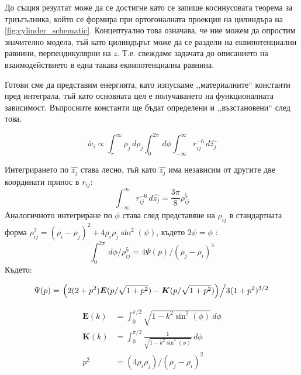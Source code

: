 До същия резултат може да се достигне като се запише косинусовата теорема за триъгълника, който се формира при ортогоналната проекция на цилиндъра на \autoref{fig:cylinder_schematic}.
Концептуално това означава, че ние можем да опростим значително модела, тъй като цилиндърът може да се раздели на еквипотенциални равнини, перпендикулярни на $z$. Т.е. свеждаме задачата
до описанието на взаимодействието в една такава еквипотенциална равнина.

Готови сме да представим енергията, като изпускаме ,,материалните`` константи пред интеграла, тъй като основната цел е получаването на функционалната зависимост. Въпросните константи ще бъдат
определени и ,,възстановени`` след това.

\begin{equation}
	\label{eq:energy_integral_raw}
	\tilde{w_i} \displaystyle\propto \displaystyle\int_{r}^{\infty} \rho_{j} \,d\rho_{j} \displaystyle\int_{0}^{2\pi} \,d\phi \displaystyle\int_{-\infty}^{\infty} r_{ij}^{-6} \,d\hat{z_{j}}
\end{equation}

Интегрирането по $\hat{z_j}$ става лесно, тъй като $\hat{z_{j}}$ има независим от другите две координати принос в $r_{ij}$:
\begin{equation*}
	\displaystyle\int_{-\infty}^{\infty} r_{ij}^{-6} \,d\hat{z_{j}} = \frac{3\pi}{8} \rho_{ij}^5
\end{equation*}
Аналогичното интегриране по $\phi$ става след представяне на $\rho_{ij}$ в стандартната форма $\rho_{ij}^2 = (\rho_i - \rho_j)^2 + 4 \rho_i \rho_j \sin^2(\psi)$, където $2\psi=\phi$ \cite{gradshteyn}:
\begin{equation*}
	\displaystyle\int_{0}^{2\pi} \,d\phi/\rho_{ij}^5 = 4\Psi(p)/(\rho_j-\rho_i)^5
\end{equation*} 
Където:

\begin{equation}
	\label{eq:psi_func}
	\Psi(p)           = \left. \left(2(2+p^2)\boldsymbol{E}(p/\sqrt{1+p^2}) - \boldsymbol{K}(p/\sqrt{1+p^2})\right)\middle/3(1+p^2)^{3/2}\right.
\end{equation}

\begin{align*}
	\boldsymbol{E}(k) & = \displaystyle\int_{0}^{\pi/2} \sqrt{1-k^2 \sin^2(\phi)} \,d\phi           \\
	\boldsymbol{K}(k) & = \displaystyle\int_{0}^{\pi/2} \frac{1}{\sqrt{1-k^2 \sin^2(\phi)}} \,d\phi \\
	p^2               & = (4 \rho_i \rho_j)/(\rho_j - \rho_i)^2                                     
\end{align*}

